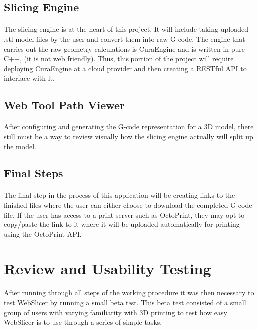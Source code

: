 \subsection{Slicing Engine}
\paragraph{}
The slicing engine is at the heart of this project. 
It will include taking uploaded .stl model files by the user and convert them into raw G-code. 
The engine that carries out the raw geometry calculations is CuraEngine and is written in pure C++, (it is not web friendly). 
Thus, this portion of the project will require deploying CuraEngine at a cloud provider and then creating a RESTful API to interface with it.

\subsection{Web Tool Path Viewer}
\paragraph{}
After configuring and generating the G-code representation for a 3D model, there still must be a way to review visually how the slicing engine actually will split up the model. 

\subsection{Final Steps}
\paragraph{}
The final step in the process of this application will be creating links to the finished files where the user can either choose to download the completed G-code file. 
If the user has access to a print server such as OctoPrint, they may opt to copy/paste the link to it where it will be uploaded automatically for printing using the OctoPrint API.

\section{Review and Usability Testing}
\paragraph{}
After running through all steps of the working procedure it was then necessary to test WebSlicer by running a small beta test. 
This beta test consisted of a small group of users with varying familiarity with 3D printing to test how easy WebSlicer is to use through a series of simple tasks.
